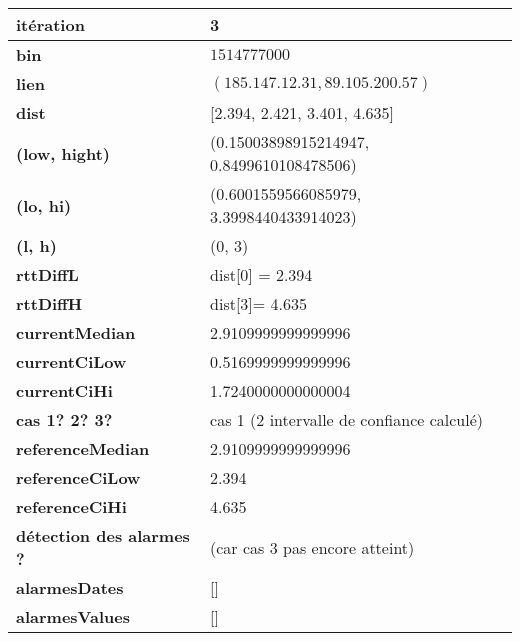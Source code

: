 	\begin{table}[H]
	\centering
	
	\begin{tabularx}{\linewidth}{|l|X| }
		\hline
		\textbf{itération} & 3	\\ \hline
		\textbf{bin} & $1514777000$ \\ \hline
		\textbf{lien} & $(185.147.12.31, 89.105.200.57)$  \\ \hline
		\textbf{dist}& [2.394, 2.421, 3.401, 4.635]	\\ \hline
		\textbf{(low, hight)}& (0.15003898915214947, 0.8499610108478506) 	\\ \hline
		\textbf{(lo, hi)}&(0.6001559566085979, 3.3998440433914023)  \\ \hline
		\textbf{(l, h)} & (0, 3) 	\\ \hline
		\textbf{rttDiffL}& dist[0] = 2.394	\\ \hline
		\textbf{rttDiffH}& dist[3]= 4.635	\\ \hline
		\textbf{currentMedian}& 2.9109999999999996	\\ \hline
		\textbf{currentCiLow}& 0.5169999999999996 	\\ \hline
		\textbf{currentCiHi}& 1.7240000000000004	\\ \hline
		\textbf{cas 1? 2? 3?}& cas 1 (2 intervalle de confiance calculé)  \\ \hline
		\textbf{referenceMedian}& 2.9109999999999996	\\ \hline
		\textbf{referenceCiLow}& 2.394	\\ \hline
		\textbf{referenceCiHi}& 4.635	\\ \hline
		\textbf{détection des alarmes ?}& (car cas 3 pas  encore atteint)	\\ \hline
		\textbf{alarmesDates}& []	\\ \hline
		\textbf{alarmesValues}& []	\\ \hline
		
		
	\end{tabularx}
\end{table}



